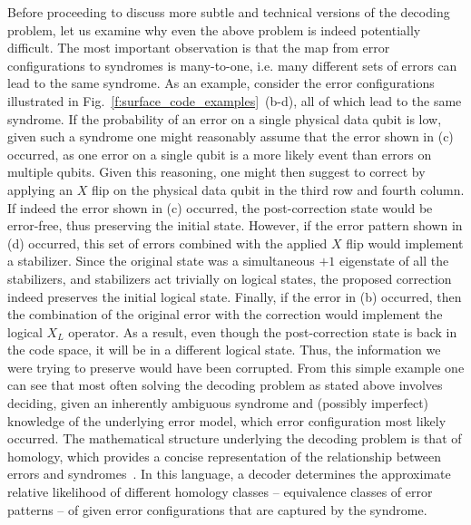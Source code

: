 \documentclass[twocolumn,preprintnumbers,amsmath,amssymb,notitlepage,nofootinbib,longbibliography,superscriptaddress,aps,pra,10pt]{revtex4-1}
\begin{document}
	\noindent Before proceeding to discuss more subtle and technical versions of the decoding problem, let us examine why even the above problem is indeed potentially difficult.
	The most important observation is that the map from error configurations to syndromes is many-to-one, i.e. many different sets of errors can lead to the same syndrome.
	As an example, consider the error configurations illustrated in Fig.~\ref{f:surface_code_examples}~(b-d), all of which lead to the same syndrome.
	If the probability of an error on a single physical data qubit is low, given such a syndrome one might reasonably assume that the error shown in (c) occurred, as one error on a single qubit is a more likely event than errors on multiple qubits.
	Given this reasoning, one might then suggest to correct by applying an $X$ flip on the physical data qubit in the third row and fourth column.
	If indeed the error shown in (c) occurred, the post-correction state would be error-free, thus preserving the initial state.
	However, if the error pattern shown in (d) occurred, this set of errors combined with the applied $X$ flip would implement a stabilizer.
	Since the original state was a simultaneous $+1$ eigenstate of all the stabilizers, and stabilizers act trivially on logical states, the proposed correction indeed preserves the initial logical state.
	Finally, if the error in (b) occurred, then the combination of the original error with the correction would implement the logical $X_L$ operator.
	As a result, even though the post-correction state is back in the code space, it will be in a different logical state.
	Thus, the information we were trying to preserve would have been corrupted.
	From this simple example one can see that most often solving the decoding problem as stated above involves deciding, given an inherently ambiguous syndrome and (possibly imperfect) knowledge of the underlying error model, which error configuration most likely occurred.
	The mathematical structure underlying the decoding problem is that of homology, which provides a 
	concise representation of the relationship between errors and syndromes~\cite{FastDecoders}.
	In this language,
	a decoder determines the approximate relative likelihood of different homology classes -- equivalence classes of 
	error patterns -- of given error configurations that are captured by the syndrome.
\end{document}
